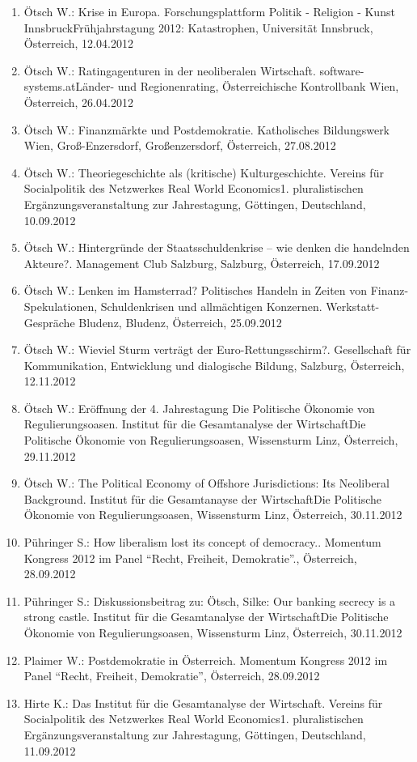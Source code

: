 \begin{enumerate}
	\item Ötsch W.: Krise in Europa. Forschungsplattform Politik - Religion - Kunst InnsbruckFrühjahrstagung 2012: Katastrophen, Universität Innsbruck, Österreich, 12.04.2012
	\item Ötsch W.: Ratingagenturen in der neoliberalen Wirtschaft. software-systems.atLänder- und Regionenrating, Österreichische Kontrollbank Wien, Österreich, 26.04.2012
	\item Ötsch W.: Finanzmärkte und Postdemokratie. Katholisches Bildungswerk Wien, Groß-Enzersdorf, Großenzersdorf, Österreich, 27.08.2012
	\item Ötsch W.: Theoriegeschichte als (kritische) Kulturgeschichte. Vereins für Socialpolitik des Netzwerkes Real World Economics1. pluralistischen Ergänzungsveranstaltung zur Jahrestagung, Göttingen, Deutschland, 10.09.2012
	\item Ötsch W.: Hintergründe der Staatsschuldenkrise – wie denken die handelnden Akteure?. Management Club Salzburg, Salzburg, Österreich, 17.09.2012
	\item Ötsch W.: Lenken im Hamsterrad? Politisches Handeln in Zeiten von Finanz-Spekulationen, Schuldenkrisen und allmächtigen Konzernen. Werkstatt-Gespräche Bludenz, Bludenz, Österreich, 25.09.2012
	\item Ötsch W.: Wieviel Sturm verträgt der Euro-Rettungsschirm?. Gesellschaft für Kommunikation, Entwicklung und dialogische Bildung, Salzburg, Österreich, 12.11.2012
	\item Ötsch W.: Eröffnung der 4. Jahrestagung Die Politische Ökonomie von Regulierungsoasen. Institut für die Gesamtanalyse der WirtschaftDie Politische Ökonomie von Regulierungsoasen, Wissensturm Linz, Österreich, 29.11.2012
	\item Ötsch W.: The Political Economy of Offshore Jurisdictions: Its Neoliberal Background. Institut für die Gesamtanayse der WirtschaftDie Politische Ökonomie von Regulierungsoasen, Wissensturm Linz, Österreich, 30.11.2012
	\item Pühringer S.: How liberalism lost its concept of democracy.. Momentum Kongress 2012 im Panel “Recht, Freiheit, Demokratie”., Österreich, 28.09.2012
	\item Pühringer S.: Diskussionsbeitrag zu: Ötsch, Silke: Our banking secrecy is a strong castle. Institut für die Gesamtanalyse der WirtschaftDie Politische Ökonomie von Regulierungsoasen, Wissensturm Linz, Österreich, 30.11.2012
	\item Plaimer W.: Postdemokratie in Österreich. Momentum Kongress 2012 im Panel “Recht, Freiheit, Demokratie”, Österreich, 28.09.2012
	\item Hirte K.: Das Institut für die Gesamtanalyse der Wirtschaft. Vereins für Socialpolitik des Netzwerkes Real World Economics1. pluralistischen Ergänzungsveranstaltung zur Jahrestagung, Göttingen, Deutschland, 11.09.2012
\end{enumerate}

